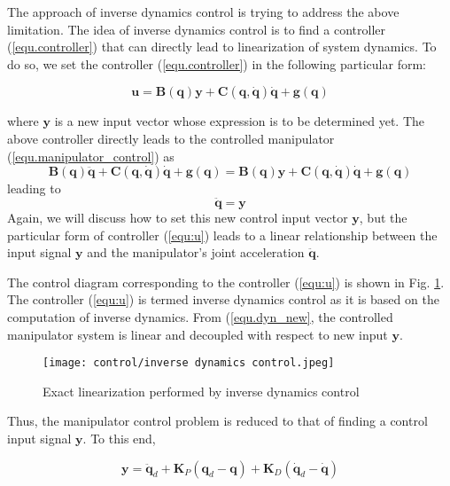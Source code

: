 \documentclass[10pt]{article}
\begin{document}
The approach of inverse dynamics control is trying to address the above limitation. The idea of  inverse dynamics control is to find a controller (\ref{equ.controller}) that can directly lead to  linearization of system dynamics. To do so, we set the controller (\ref{equ.controller}) in the following particular form:
\begin{shaded}
    \begin{equation}\label{equ:u}
    \boldsymbol{u}=\boldsymbol{B}(\boldsymbol{q}) \boldsymbol{y}+\boldsymbol{C}(\boldsymbol{q}, \dot{\boldsymbol{q}}) \dot{\boldsymbol{q}}+\boldsymbol{g}(\boldsymbol{q})
\end{equation}
\end{shaded}
where $\boldsymbol{y}$ is a new input vector whose expression is to be determined yet. The above controller directly leads to the controlled manipulator (\ref{equ.manipulator_control}) as
$$
 \boldsymbol{B}(\boldsymbol{q}) \ddot{\boldsymbol{q}}+\boldsymbol{C}(\boldsymbol{q}, \dot{\boldsymbol{q}}) \dot{\boldsymbol{q}}+\boldsymbol{g}(\boldsymbol{q})=\boldsymbol{B}(\boldsymbol{q}) \boldsymbol{y}+\boldsymbol{C}(\boldsymbol{q}, \dot{\boldsymbol{q}}) \dot{\boldsymbol{q}}+\boldsymbol{g}(\boldsymbol{q})
 $$
leading to 
\begin{equation}\label{equ.dyn_new}
\boldsymbol{\ddot{q}}=\boldsymbol{y} 
\end{equation}
Again, we will discuss how to set this new control input vector $\boldsymbol{y}$, but the particular form of controller (\ref{equ:u}) leads to a linear relationship between the input signal $\boldsymbol{y}$ and the manipulator's joint acceleration $\ddot{\boldsymbol{q}}$. 



The control diagram corresponding to the controller (\ref{equ:u}) is shown in Fig. \ref{fig:2}. The controller (\ref{equ:u}) is termed inverse dynamics control as it is based on the computation of  inverse dynamics. From (\ref{equ.dyn_new}, the controlled manipulator system   is linear and decoupled with respect to new input $\boldsymbol{y}$.

\begin{figure}[H]
    \centering
    \texttt{[image: control/inverse dynamics control.jpeg]}
    \caption{Exact linearization performed by inverse dynamics control}
    \label{fig:2}
\end{figure}




Thus, the manipulator control problem is reduced to that of finding a  control input signal $\boldsymbol{y}$. To this end, 
\begin{shaded}
    \begin{equation}\label{equ.y}
    \boldsymbol{y}=\ddot{\boldsymbol{{q}}}_d+\boldsymbol{K}_{P} ({\boldsymbol{q}}_{d}-\boldsymbol{q})+\boldsymbol{K}_{D} (\dot{\boldsymbol{q}}_{d}-\dot{\boldsymbol{q}})
\end{equation}
\end{shaded}
\end{document}
